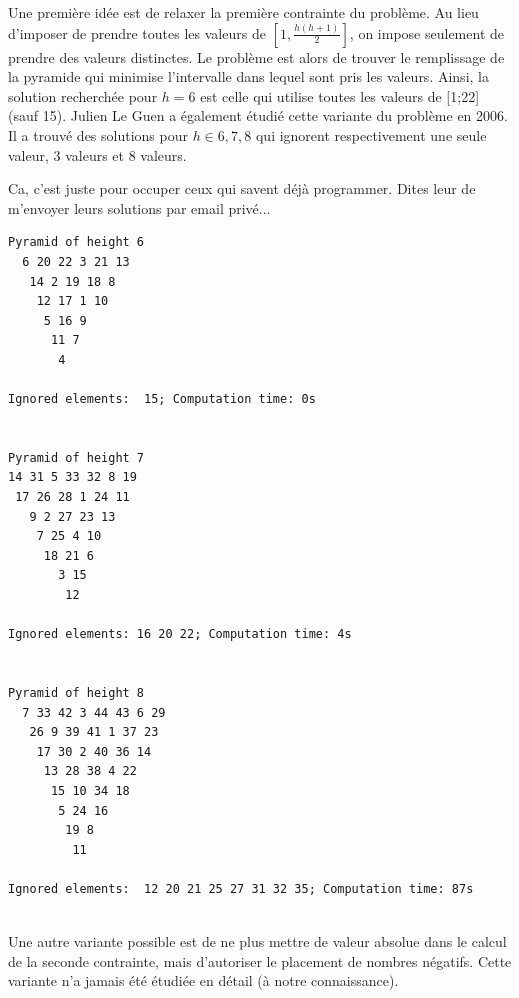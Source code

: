 \documentclass[10pt]{article}\usepackage[nu]{esial}
\begin{document}
\begin{Exercice}
  \Question %
  Une première idée est de relaxer la première contrainte du problème. Au lieu
  d'imposer de prendre toutes les valeurs de $\left[1,\frac{h(h+1)}{2}\right]$,
  on impose seulement de prendre des valeurs distinctes.
  Le problème est alors de trouver le remplissage de la pyramide qui minimise
  l'intervalle dans lequel sont pris les valeurs. Ainsi, la solution recherchée
  pour $h=6$ est celle qui utilise toutes les valeurs de [1;22] (sauf
  15). Julien Le Guen a également étudié cette variante du problème en 2006. Il
  a trouvé des solutions pour $h\in{6,7,8}$ qui ignorent respectivement une
  seule valeur, 3 valeurs et 8 valeurs.


\begin{Reponse}
  Ca, c'est juste pour occuper ceux qui savent déjà programmer. Dites leur de
  m'envoyer leurs solutions par email privé...

  \begin{Verbatim}
Pyramid of height 6
  6 20 22 3 21 13
   14 2 19 18 8
    12 17 1 10
     5 16 9
      11 7
       4
  
Ignored elements:  15; Computation time: 0s
  

Pyramid of height 7
14 31 5 33 32 8 19
 17 26 28 1 24 11
   9 2 27 23 13
    7 25 4 10
     18 21 6
       3 15
        12

Ignored elements: 16 20 22; Computation time: 4s

  
Pyramid of height 8
  7 33 42 3 44 43 6 29
   26 9 39 41 1 37 23
    17 30 2 40 36 14
     13 28 38 4 22
      15 10 34 18
       5 24 16
        19 8
         11
  
Ignored elements:  12 20 21 25 27 31 32 35; Computation time: 87s
    
  \end{Verbatim}
\end{Reponse}
\Question %
Une autre variante possible est de ne plus mettre de valeur absolue dans le
calcul de la seconde contrainte, mais d'autoriser le placement de nombres
négatifs. Cette variante n'a jamais été étudiée en détail (à notre
connaissance).
\end{Exercice}
\end{document}
